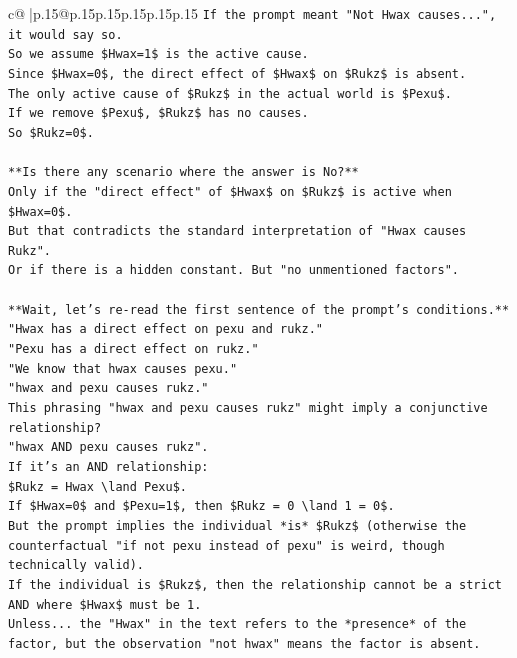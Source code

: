 \documentclass{article}
\begin{document}
{\begin{supertabular}{c@{$\;$}|p{.15\linewidth}@{}p{.15\linewidth}p{.15\linewidth}p{.15\linewidth}p{.15\linewidth}p{.15\linewidth}}
{{{\texttt{If the prompt meant "Not Hwax causes...", it would say so.} \\
\texttt{So we assume \$Hwax=1\$ is the active cause.} \\
\texttt{Since \$Hwax=0\$, the direct effect of \$Hwax\$ on \$Rukz\$ is absent.} \\
\texttt{The only active cause of \$Rukz\$ in the actual world is \$Pexu\$.} \\
\texttt{If we remove \$Pexu\$, \$Rukz\$ has no causes.} \\
\texttt{So \$Rukz=0\$.} \\
\\ 
\texttt{**Is there any scenario where the answer is No?**} \\
\texttt{Only if the "direct effect" of \$Hwax\$ on \$Rukz\$ is active when \$Hwax=0\$.} \\
\texttt{But that contradicts the standard interpretation of "Hwax causes Rukz".} \\
\texttt{Or if there is a hidden constant. But "no unmentioned factors".} \\
\\ 
\texttt{**Wait, let's re{-}read the first sentence of the prompt's conditions.**} \\
\texttt{"Hwax has a direct effect on pexu and rukz."} \\
\texttt{"Pexu has a direct effect on rukz."} \\
\texttt{"We know that hwax causes pexu."} \\
\texttt{"hwax and pexu causes rukz."} \\
\texttt{This phrasing "hwax and pexu causes rukz" might imply a conjunctive relationship?} \\
\texttt{"hwax AND pexu causes rukz".} \\
\texttt{If it's an AND relationship:} \\
\texttt{\$Rukz = Hwax \textbackslash{}land Pexu\$.} \\
\texttt{If \$Hwax=0\$ and \$Pexu=1\$, then \$Rukz = 0 \textbackslash{}land 1 = 0\$.} \\
\texttt{But the prompt implies the individual *is* \$Rukz\$ (otherwise the counterfactual "if not pexu instead of pexu" is weird, though technically valid).} \\
\texttt{If the individual is \$Rukz\$, then the relationship cannot be a strict AND where \$Hwax\$ must be 1.} \\
\texttt{Unless... the "Hwax" in the text refers to the *presence* of the factor, but the observation "not hwax" means the factor is absent.} \\
}}}
\end{supertabular}}
\end{document}
